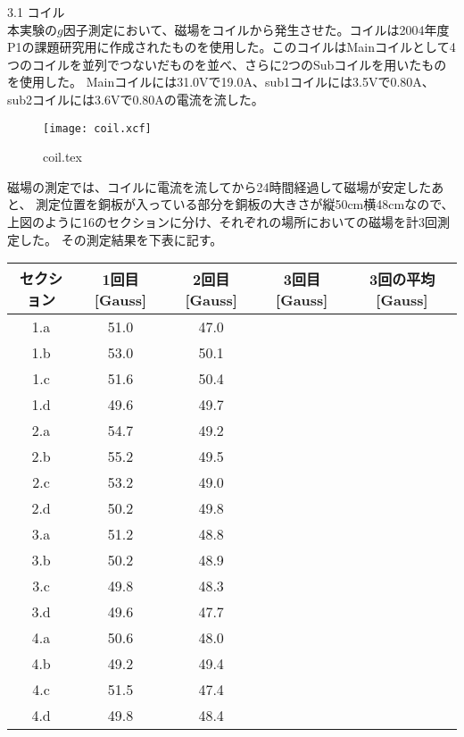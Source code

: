 3.1  コイル\\
  本実験の\(g\)因子測定において、磁場をコイルから発生させた。コイルは2004年度P1の課題研究用に作成されたものを使用した。このコイルはMainコイルとして4つのコイルを並列でつないだものを並べ、さらに2つのSubコイルを用いたものを使用した。
Mainコイルには31.0Vで19.0A、sub1コイルには3.5Vで0.80A、sub2コイルには3.6Vで0.80Aの電流を流した。
\begin{figure}[htbp]
 \begin{center}
  \texttt{[image: coil.xcf]}
  \caption[width=100mm]{coil.tex}
 \end{center}
\end{figure}
磁場の測定では、コイルに電流を流してから24時間経過して磁場が安定したあと、
測定位置を銅板が入っている部分を銅板の大きさが縦50cm横48cmなので、上図のように16のセクションに分け、それぞれの場所においての磁場を計3回測定した。
その測定結果を下表に記す。
\begin{center}
\begin{tabular}{c|ccc|c}\hline
  セクション&1回目[Gauss]&2回目[Gauss]&3回目[Gauss]&3回の平均[Gauss]\\ \hline
  1.a & 51.0 & 47.0 & & \\
  1.b & 53.0 & 50.1 & & \\
  1.c & 51.6 & 50.4 & & \\
  1.d & 49.6 & 49.7 & & \\
  2.a & 54.7 & 49.2 & & \\
  2.b & 55.2 & 49.5 & & \\
  2.c & 53.2 & 49.0 & & \\
  2.d & 50.2 & 49.8 & & \\
  3.a & 51.2 & 48.8 & & \\
  3.b & 50.2 & 48.9 & & \\
  3.c & 49.8 & 48.3 & & \\
  3.d & 49.6 & 47.7 & & \\
  4.a & 50.6 & 48.0 & & \\
  4.b & 49.2 & 49.4 & & \\
  4.c & 51.5 & 47.4 & & \\
  4.d & 49.8 & 48.4 & & \\
\end{tabular}
\end{center}
